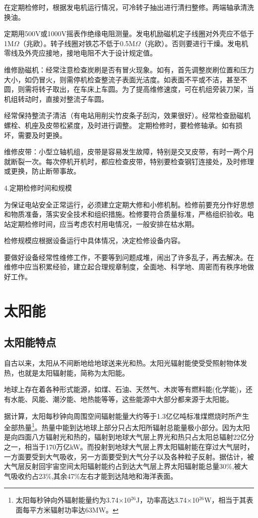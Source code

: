 \documentclass{ctexbook}
\begin{document}
在定期检修时，根据发电机运行情况，可冷转子抽出进行清扫整修。两端轴承清洗换油。

定期用500V或1000V摇表作绝缘电阻测量。发电机励磁机定子线圈对外壳应不低于1M$\Omega$（兆欧）。转子线圈对铁芯不低于0.5M$\Omega$（兆欧）。否则要进行干燥。发电机零线及外壳应接地，接地电阻不大于设计规定值。

维修励磁机：经常注意检查炭刷是否有冒火现象。如有，首先调整炭刷位置和压力大小，如仍冒火，则需停机检查整流子表面光洁度。如表面不平或不洁，甚至不圆，则需将转子取出，在车床上车圆。为了提高维修速度，可在机组旁装刀架，当机组转动时，直接对整流子车圆。

经常保持整流子清洁（有电站用削尖竹皮条子刮沟，效果很好）。经常检查励磁机螺栓、机座及皮带松紧度，及时进行调整。
定期检修时，要检修轴承。如有损坏，需要及时更换。

维修皮带：小型立轴机组，皮带是容易发生故障，特别是交叉皮带，有时一两个月就断裂一次。每次停机开机时，都应检查皮带，特别要检查钢钉连接处，及时修理或更换，防止断带事故。

4.定期检修时间和规模

为保证电站安全正常运行，必须建立定期大修和小修机制。检修前要充分作好思想和物质准备，落实安全技术和组织措施。检修要符合质量标准，严格组织验收。电站定期检修时间，应当考虑农村用电情况，一般安排在枯水期。

检修规模应根据设备运行中具体情况，决定检修设备内容。

要做好设备经常性维修工作，不要等到问题成堆，闹出了许多乱子，再去解决。在维修中应当积累经验，建立起合理规章制度，全面地、科学地、周密而有秩序地做好工作。

\section{太阳能}
\subsection{太阳能特点}
自古以来，太阳从不间断地给地球送来光和热。太阳光辐射能使受受照射物体发热，也就是太阳辐射能，简称为太阳能。

地球上存在着各种形式能源，如煤、石油、天然气、木炭等有燃料能(化学能)，还有水能、风能、潮汐能、地热能等等，这些能源中大部分都来源于太阳能。

据计算，太阳每秒钟向周围空间辐射能量大约等于1.3亿亿吨标准煤燃烧时所产生全部热量\footnote{太阳每秒钟向外辐射能量约为3.74$\times$10$^{26}$J，功率高达3.74$\times$10$^{26}$W，相当于其表面每平方米辐射功率达63MW。}。热量中能到达地球上部分只占太阳所辐射总能量极小部分。因为太阳是向四面八方辐射光和热的，辐射到地球大气层上界光和热只占太阳总辐射22亿分之一，相当于170万亿kW。而投射到地球大气层上界太阳辐射能在穿过大气层时，一方面要受到大气吸收，另一方面要受到大气分子以及各种粒子反射。据估计，被大气层反射回宇宙空间太阳辐射能约占到达大气层上界太阳辐射能总量30\%,被大气吸收约占23\%,其余47\%左右才能到达陆地和海洋表面。
\end{document}
